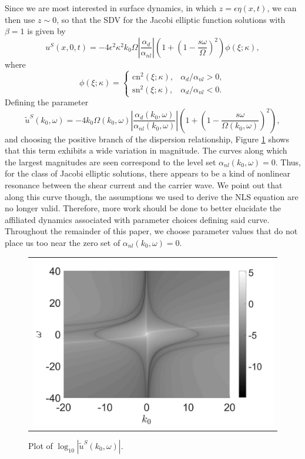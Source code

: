 \documentclass{JFM_Style/jfm}
\newcommand{\ba}{\begin{array}}
\newcommand{\ea}{\end{array}}
\begin{document}
Since we are most interested in surface dynamics, in which $z=\epsilon\eta(x,t)$, we can then use $z\sim 0$, so that the SDV for the Jacobi elliptic function solutions with $\beta=1$ is given by
\[
u^{S}(x,0,t) = -4\epsilon^{2}\kappa^{2}k_{0}\Omega \left|\frac{\alpha_{d}}{\alpha_{nl}}\right| \left(1 + \left(1 - \frac{s\omega}{\Omega} \right)^{2} \right)\phi(\xi;\kappa),
\]
where
\[
\phi(\xi;\kappa) = \left\{\ba{rl} \mbox{cn}^2(\xi;\kappa), & \alpha_{d}/\alpha_{nl}>0, \\  \mbox{sn}^2(\xi;\kappa), & \alpha_{d}/\alpha_{nl}<0.\ea \right.
\]
Defining the parameter
\[
\tilde{u}^{S}(k_{0},\omega) = -4 k_{0}\Omega(k_{0},\omega) \left|\frac{\alpha_{d}(k_{0},\omega)}{\alpha_{nl}(k_{0},\omega)}\right|\left(1 + \left(1 - \frac{s\omega}{\Omega(k_{0},\omega)} \right)^{2} \right),
\]
and choosing the positive branch of the dispersion relationship, Figure \ref{fig:sdriftmag_sign} shows that this term exhibits a wide variation in magnitude.  The curves along which the largest magnitudes are seen correspond to the level set $\alpha_{nl}(k_{0},\omega)=0$.  Thus, for the class of Jacobi elliptic solutions, there appears to be a kind of nonlinear resonance between the shear current and the carrier wave.  We point out that along this curve though, the assumptions we used to derive the NLS equation are no longer valid.  Therefore, more work should be done to better elucidate the affiliated dynamics associated with parameter choices defining said curve.  Throughout the remainder of this paper, we choose parameter values that do not place us too near the zero set of $\alpha_{nl}(k_{0},\omega)=0$.
\begin{figure}
\centering
\begin{tabular}{c}
\includegraphics[width=.48\textwidth]{us_magnitude} 
\end{tabular}
\caption{\small Plot of $\log_{10}|\tilde{u}^{S}(k_{0},\omega)|$.}
\label{fig:sdriftmag_sign}
\end{figure} 
\end{document}
